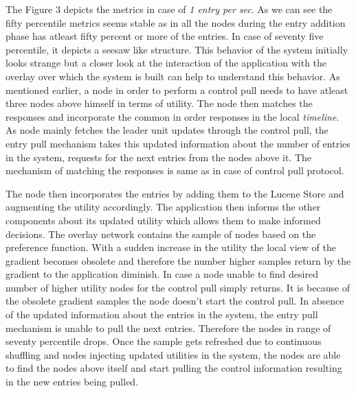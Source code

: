 \documentclass[a4paper, 11pt]{article}
\begin{document}
\par The Figure 3 depicts the metrics in case of \textit{1 entry per sec}. As we can see the fifty percentile metrics seems stable as in all the nodes during the entry addition phase has atleast fifty percent or more of the entries. In case of seventy five percentile, it depicts a seesaw like structure. This behavior of the system initially looks strange but a closer look at the interaction of the application with the overlay over which the system is built can help to understand this behavior. As mentioned earlier, a node in order to perform a control pull needs to have atleast three nodes above himself in terms of utility. The node then matches the responses and incorporate the common in order responses in the local \textit{timeline}. As node mainly fetches the leader unit updates through the control pull, the entry pull mechanism takes this updated information about the number of entries in the system, requests for the next entries from the nodes above it. The mechanism of matching the responses is same as in case of control pull protocol. 
\par The node then incorporates the entries by adding them to the Lucene Store and augmenting the utility accordingly. The application then informs the other components about its updated utility which allows them to make informed decisions. The overlay network contains the sample of nodes based on the preference function. With a sudden increase in the utility the local view of the gradient becomes obsolete and therefore the number higher samples return by the gradient to the application diminish. In case a node unable to find desired number of higher utility nodes for the control pull simply returns. It is because of the obsolete gradient samples the node doesn't start the control pull. In absence of the updated information about the entries in the system, the entry pull mechanism is unable to pull the next entries. Therefore the nodes in range of seventy percentile drops. Once the sample gets refreshed due to continuous shuffling and nodes injecting updated utilities in the system, the nodes are able to find the nodes above itself and start pulling the control information  resulting in the new entries being pulled.
\end{document}
